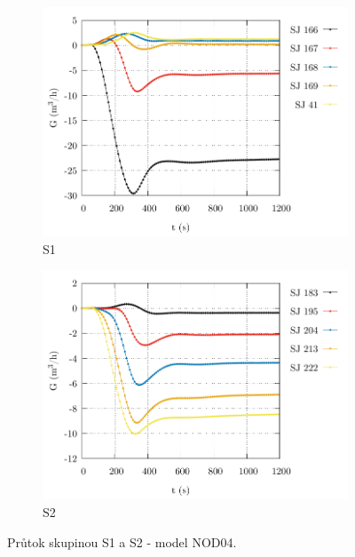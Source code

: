 \begin{figure}
	\centering
	\begin{subfigure}{0.5\textwidth}
		\centering
		\includegraphics[width=\textwidth, trim={0cm 0cm 0cm 0cm}, clip]{./05_TH_model_VR_1/grafy/G_time_nod_04_0.pdf}
		\caption{S1}
		\label{fig:g_time_nod_04_0_prilohy}
	\end{subfigure}%
	\hfill
	\begin{subfigure}{0.5\textwidth}
		\centering
		\includegraphics[width=\textwidth, trim={0cm 0cm 0cm 0cm}, clip]{./05_TH_model_VR_1/grafy/G_time_nod_04_1.pdf}
		\caption{S2}
		\label{fig:g_time_nod_04_1_prilohy}
	\end{subfigure}%
	\caption{Průtok skupinou S1 a S2 - model NOD04.}
\end{figure}
